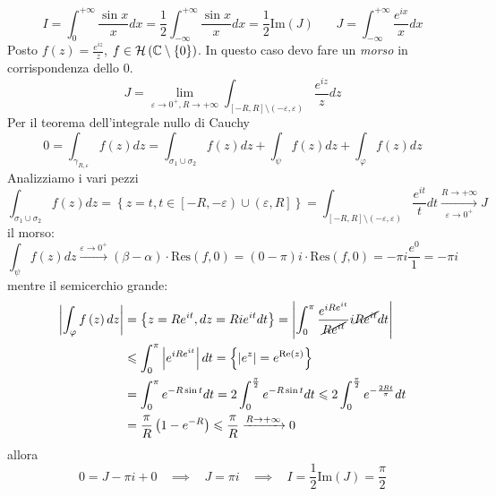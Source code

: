\Soluzione
\begin{equation*}
I=\int ^{+\infty }_{0}\frac{\sin x}{x} dx=\frac{1}{2}\int ^{+\infty }_{-\infty }\frac{\sin x}{x} dx=\frac{1}{2}\mathrm{Im}\left( J\right) \ \ \ \ \ \ \ \ J=\int ^{+\infty }_{-\infty }\frac{e^{ix}}{x} dx
\end{equation*}
Posto $f\left( z\right) =\frac{e^{iz}}{z}$, $f\in \mathcal{H} \left(\mathbb{C}  \setminus \left\{0\right\}\right)$. In questo caso devo fare un \textit{morso} in corrispondenza dello $0$.
\begin{equation*}
J=\lim _{\varepsilon \rightarrow 0^{+} ,R\rightarrow +\infty }\int _{\left[ -R,R\right] \setminus \left( -\varepsilon ,\varepsilon \right)}\frac{e^{iz}}{z} dz
\end{equation*}
Per il teorema dell'integrale nullo di Cauchy
\begin{equation*}
0=\int _{\gamma _{R,\varepsilon }} f\left( z\right) dz=\int _{\sigma _{1} \cup \sigma _{2}} f\left( z\right) dz+\int _{\psi } f\left( z\right) dz+\int _{\varphi } f\left( z\right) dz
\end{equation*}
Analizziamo i vari pezzi
\begin{equation*}
\int _{\sigma _{1} \cup \sigma _{2}} f\left( z\right) dz=\left\{z=t,t\in \left[ -R,-\varepsilon \right) \cup \left( \varepsilon ,R\right]\right\} =\int _{\left[ -R,R\right] \setminus \left( -\varepsilon ,\varepsilon \right)}\frac{e^{it}}{t} dt\xrightarrow[\varepsilon \rightarrow 0^{+}]{R\rightarrow +\infty } J
\end{equation*}
il morso:
\begin{equation*}
\int _{\psi } f\left( z\right) dz\xrightarrow{\varepsilon \rightarrow 0^{+}}\left( \beta -\alpha \right) \cdotp \mathrm{Res}\left( f,0\right) =\left( 0-\pi \right) i\cdotp \mathrm{Res}\left( f,0\right) =-\pi i\frac{e^{0}}{1} =-\pi i
\end{equation*}
mentre il semicerchio grande:
\begin{align*}
\left| \int _{\varphi } f\left( z\right) dz\right|  & =\left\{z=Re^{it} ,dz=Rie^{it} dt\right\} =\left| \int ^{\pi }_{0}\frac{e^{iRe^{it}}}{\cancel{Re^{it}}} i\cancel{Re^{it}} dt\right| \\
 & \leqslant \int ^{\pi }_{0}\left| e^{iRe^{it}}\right| dt=\left\{\left| e^{z}\right| =e^{\mathrm{Re}\left( z\right)}\right\}\\
 & =\int ^{\pi }_{0} e^{-R\sin t} dt=2\int ^{\frac{\pi }{2}}_{0} e^{-R\sin t} dt\leqslant 2\int ^{\frac{\pi }{2}}_{0} e^{-\frac{2Rt}{\pi }} dt\\
 & =\frac{\pi }{R}\left( 1-e^{-R}\right) \leqslant \frac{\pi }{R}\xrightarrow{R\rightarrow +\infty } 0
\end{align*}
allora
\begin{equation*}
0=J-\pi i+0\ \ \ \ \implies \ \ \ \ J=\pi i\ \ \ \ \implies \ \ \ \ I=\frac{1}{2}\mathrm{Im}\left( J\right) =\frac{\pi }{2}
\end{equation*}
\Soluzione

